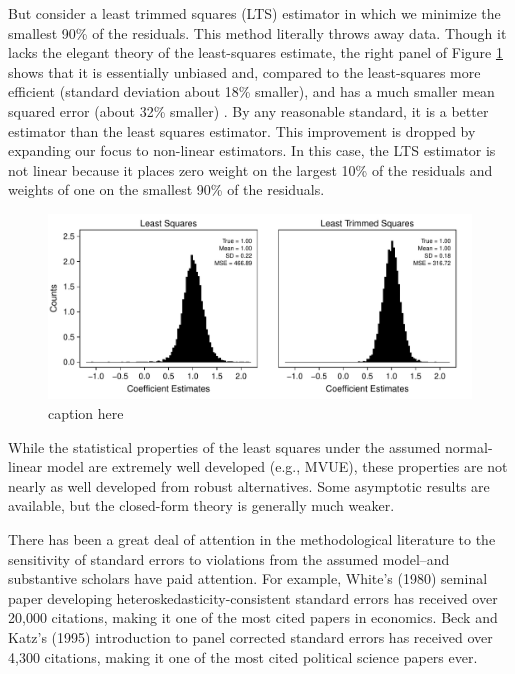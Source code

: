 \documentclass[12pt]{article}
\begin{document}
But consider a least trimmed squares (LTS) estimator in which we minimize the smallest 90\% of the residuals. This method literally throws away data. Though it lacks the elegant theory of the least-squares estimate, the right panel of Figure \ref{fig:lts-illustration} shows that it is essentially unbiased and, compared to the least-squares more efficient (standard deviation about 18\% smaller), and has a much smaller mean squared error (about 32\% smaller) . By any reasonable standard, it is a better estimator than the least squares estimator. This improvement is dropped by expanding our focus to non-linear estimators. In this case, the LTS estimator is not linear because it places zero weight on the largest 10\% of the residuals and weights of one on the smallest 90\% of the residuals.

\begin{figure}[H]
\begin{center}
\includegraphics[scale = .7]{figs/lts-illustration.pdf}
\caption{caption here}\label{fig:lts-illustration}
\end{center}
\end{figure}

While the statistical properties of the least squares under the assumed normal-linear model are extremely well developed (e.g., MVUE), these properties are not nearly as well developed from robust alternatives. Some asymptotic results are available, but the closed-form theory is generally much weaker.

There has been a great deal of attention in the methodological literature to the sensitivity of standard errors to violations from the assumed model--and substantive scholars have paid attention. For example, White's (1980) seminal paper developing heteroskedasticity-consistent standard errors has received over 20,000 citations, making it one of the most cited papers in economics. Beck and Katz's (1995) introduction to panel corrected standard errors has received over 4,300 citations, making it one of the most cited political science papers ever.
\end{document}
